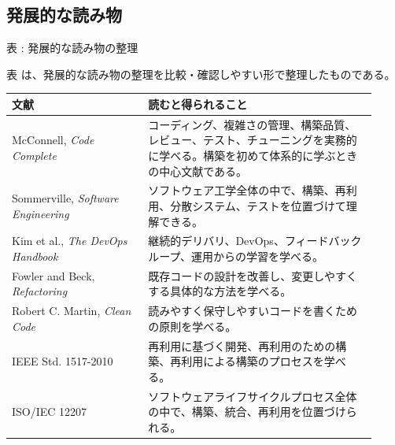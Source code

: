 \subsection{発展的な読み物}

\par\smallskip\noindent{}\label{tab:ch04-05}表 \thetable: 発展的な読み物の整理\par\smallskip
表 \thetable は、発展的な読み物の整理を比較・確認しやすい形で整理したものである。\par\smallskip
\begin{longtable}{L{0.34\linewidth}L{0.58\linewidth}}
\toprule
文献 & 読むと得られること \\
\midrule
McConnell, \textit{Code Complete} & コーディング、複雑さの管理、構築品質、レビュー、テスト、チューニングを実務的に学べる。構築を初めて体系的に学ぶときの中心文献である。 \\
Sommerville, \textit{Software Engineering} & ソフトウェア工学全体の中で、構築、再利用、分散システム、テストを位置づけて理解できる。 \\
Kim et al., \textit{The DevOps Handbook} & 継続的デリバリ、DevOps、フィードバックループ、運用からの学習を学べる。 \\
Fowler and Beck, \textit{Refactoring} & 既存コードの設計を改善し、変更しやすくする具体的な方法を学べる。 \\
Robert C. Martin, \textit{Clean Code} & 読みやすく保守しやすいコードを書くための原則を学べる。 \\
IEEE Std. 1517-2010 & 再利用に基づく開発、再利用のための構築、再利用による構築のプロセスを学べる。 \\
ISO/IEC 12207 & ソフトウェアライフサイクルプロセス全体の中で、構築、統合、再利用を位置づけられる。 \\
\bottomrule
\end{longtable}
